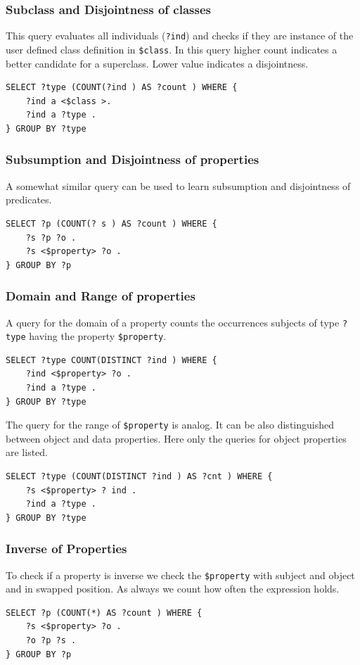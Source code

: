 \subsubsection*{Subclass and Disjointness of classes}
This query evaluates all individuals (\texttt{?ind}) and checks if they are
instance of the user defined class definition in \texttt{\$class}. In this query
higher count indicates a better candidate for a superclass. 
Lower value indicates a disjointness.
 
\begin{lstlisting} 
SELECT ?type (COUNT(?ind ) AS ?count ) WHERE {
	?ind a <$class >.
	?ind a ?type .
} GROUP BY ?type
\end{lstlisting}

\subsubsection*{Subsumption and Disjointness of properties}
A somewhat similar query can be used to learn subsumption and disjointness of
predicates.

\begin{lstlisting} 
SELECT ?p (COUNT(? s ) AS ?count ) WHERE {
	?s ?p ?o .
	?s <$property> ?o .
} GROUP BY ?p
\end{lstlisting}

\subsubsection*{Domain and Range of properties}
A query for the domain of a property counts the occurrences subjects of type
\texttt{?type} having the property \texttt{\$property}.

\begin{lstlisting} 
SELECT ?type COUNT(DISTINCT ?ind ) WHERE {
	?ind <$property> ?o .
	?ind a ?type .
} GROUP BY ?type
\end{lstlisting}

The query for the range of \texttt{\$property} is analog. It can be also
distinguished between object and data properties. Here only the queries for
object properties are listed.
\begin{lstlisting} 
SELECT ?type (COUNT(DISTINCT ?ind ) AS ?cnt ) WHERE {
	?s <$property> ? ind .
	?ind a ?type .
} GROUP BY ?type
\end{lstlisting}


\subsubsection*{Inverse of Properties}
To check if a property is inverse we check the \texttt{\$property} with subject
and object and in swapped position. As always we count how often the expression
holds.
\begin{lstlisting} 
SELECT ?p (COUNT(*) AS ?count ) WHERE {
	?s <$property> ?o .
	?o ?p ?s .
} GROUP BY ?p
\end{lstlisting}


